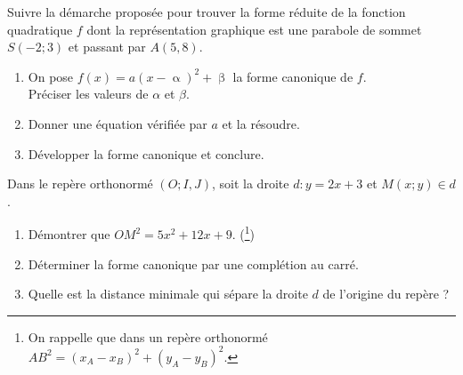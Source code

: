 \documentclass[main.tex]{subfiles}
\begin{document}
\begin{exercise}  
	 Suivre la démarche proposée pour trouver la forme réduite de la fonction quadratique $f$ dont la représentation graphique est une parabole de sommet $S(-2;3)$ et passant par $A(5,8)$.
	\begin{enumerate}[label=\alph*), leftmargin=*]
		\item On pose $f(x)=a(x-\upalpha)^2+\upbeta$ la forme canonique de $f$.\\
		Préciser les valeurs de $\alpha$ et $\beta$.
		\item Donner une équation vérifiée par $a$ et la résoudre.
		\item Développer la forme canonique et conclure.
	\end{enumerate} 
	\end{exercise} 
\begin{problem}\hfill
	
\noindent Dans le repère orthonormé $(O; I,J)$, soit la droite $d\colon y = 2x+3$ et $M(x;y)\in d$.
\begin{enumerate}[label=\alph*), leftmargin=*]
		\item Démontrer que $OM^2= 5x^2 + 12x + 9$. (\footnote{On rappelle que dans un repère orthonormé $AB^2 = (x_A-x_B)^2+(y_A-y_B)^2$.})
		\item Déterminer la forme canonique par une complétion au carré.
		\item Quelle est la distance minimale qui sépare la droite $d$ de l'origine du repère ?
	\end{enumerate} 
\end{problem}
 
%	 
\end{document}
